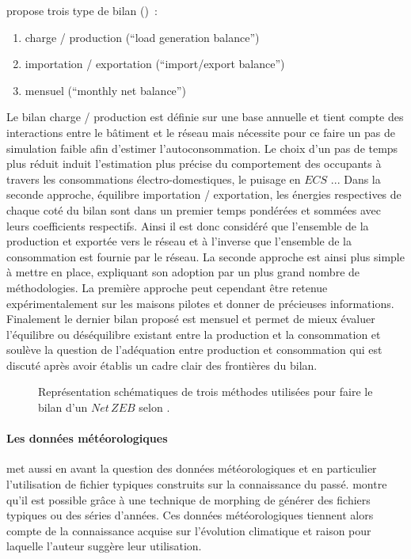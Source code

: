 \textcite{Sartori2012220} propose trois type de bilan ()~:
\begin{enumerate}
    \item charge / production (\enquote{load generation balance})
    \item importation / exportation (\enquote{import/export balance})
    \item mensuel (\enquote{monthly net balance})
\end{enumerate}
Le bilan charge / production est définie sur une base annuelle
et tient compte des interactions entre le bâtiment et le réseau mais nécessite pour
ce faire un pas de simulation faible afin d’estimer l’autoconsommation.
Le choix d’un pas de temps plus réduit induit l’estimation plus précise du comportement
des occupants à travers les consommations électro-domestiques, le puisage en $ECS$ ...
Dans la seconde approche, équilibre importation / exportation, les énergies respectives
de chaque coté du bilan sont dans un premier temps pondérées et sommées avec leurs coefficients
respectifs. Ainsi il est donc considéré que l’ensemble de la production et exportée vers le réseau
et à l’inverse que l’ensemble de la consommation est fournie par le réseau. La seconde approche est ainsi plus
simple à mettre en place, expliquant son adoption par un plus grand nombre de méthodologies.
La première approche peut cependant être retenue expérimentalement sur les maisons pilotes
et donner de précieuses informations. Finalement le dernier bilan proposé est mensuel et
permet de mieux évaluer l’équilibre ou déséquilibre existant entre la production et la
consommation et soulève la question de l’adéquation entre production et consommation
qui est discuté après avoir établis un cadre clair des frontières du bilan.
\begin{figure}
    \centering
    \caption{Représentation schématiques de trois méthodes utilisées pour faire
             le bilan d’un $Net\,ZEB$ selon \textcite{Sartori2012220}.}
    \label{fig:bilan_zeb}
\end{figure}

\paragraph{Les données météorologiques} %
\label{par:les_donnees_meteorologiques}
\textcite{Sartori2010} met aussi en avant la question des données météorologiques
et en particulier l’utilisation de fichier typiques construits sur la connaissance
du passé. \textcite{Robert2012150} montre qu’il est possible grâce à une technique de morphing
\parencite{Belcher200549} de générer des fichiers typiques ou des séries d’années. Ces
données météorologiques tiennent alors compte de la connaissance acquise sur l’évolution
climatique et raison pour laquelle l’auteur suggère leur utilisation.


